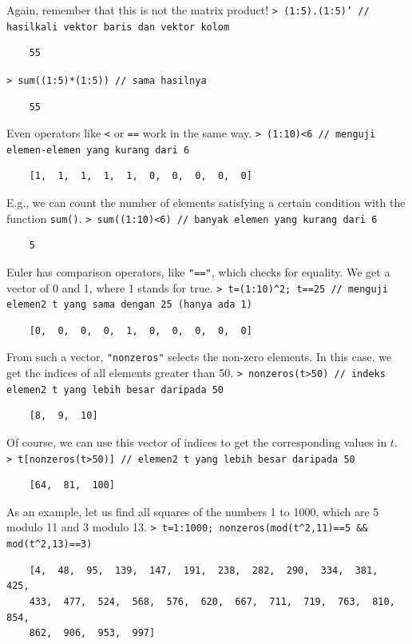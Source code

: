 \documentclass[11pt, a4paper]{article}
\newcommand{\emtcmd}[1]{\noindent\texttt{\textcolor{emtcommand}{>}\ #1}\par\smallskip}
\begin{document}
Again, remember that this is not the matrix product!
\emtcmd{(1:5).(1:5)' \textcolor{emtcomment}{// hasilkali vektor baris dan vektor kolom}}
\begin{verbatim}
    55
\end{verbatim}
\emtcmd{sum((1:5)*(1:5)) \textcolor{emtcomment}{// sama hasilnya}}
\begin{verbatim}
    55
\end{verbatim}

Even operators like \texttt{<} or \texttt{==} work in the same way.
\emtcmd{(1:10)<6 \textcolor{emtcomment}{// menguji elemen-elemen yang kurang dari 6}}
\begin{verbatim}
    [1,  1,  1,  1,  1,  0,  0,  0,  0,  0]
\end{verbatim}

E.g., we can count the number of elements satisfying a certain condition with the function \texttt{sum()}.
\emtcmd{sum((1:10)<6) \textcolor{emtcomment}{// banyak elemen yang kurang dari 6}}
\begin{verbatim}
    5
\end{verbatim}

Euler has comparison operators, like \texttt{"=="}, which checks for equality. We get a vector of 0 and 1, where 1 stands for true.
\emtcmd{t=(1:10)\^{}2; t==25 \textcolor{emtcomment}{// menguji elemen2 t yang sama dengan 25 (hanya ada 1)}}
\begin{verbatim}
    [0,  0,  0,  0,  1,  0,  0,  0,  0,  0]
\end{verbatim}

From such a vector, \texttt{"nonzeros"} selects the non-zero elements. In this case, we get the indices of all elements greater than 50.
\emtcmd{nonzeros(t>50) \textcolor{emtcomment}{// indeks elemen2 t yang lebih besar daripada 50}}
\begin{verbatim}
    [8,  9,  10]
\end{verbatim}

Of course, we can use this vector of indices to get the corresponding values in $t$.
\emtcmd{t[nonzeros(t>50)] \textcolor{emtcomment}{// elemen2 t yang lebih besar daripada 50}}
\begin{verbatim}
    [64,  81,  100]
\end{verbatim}

As an example, let us find all squares of the numbers 1 to 1000, which are 5 modulo 11 and 3 modulo 13.
\emtcmd{t=1:1000; nonzeros(mod(t\^{}2,11)==5 \&\& mod(t\^{}2,13)==3)}
\begin{verbatim}
    [4,  48,  95,  139,  147,  191,  238,  282,  290,  334,  381,  425,
    433,  477,  524,  568,  576,  620,  667,  711,  719,  763,  810,  854,
    862,  906,  953,  997]
\end{verbatim}
\end{document}
